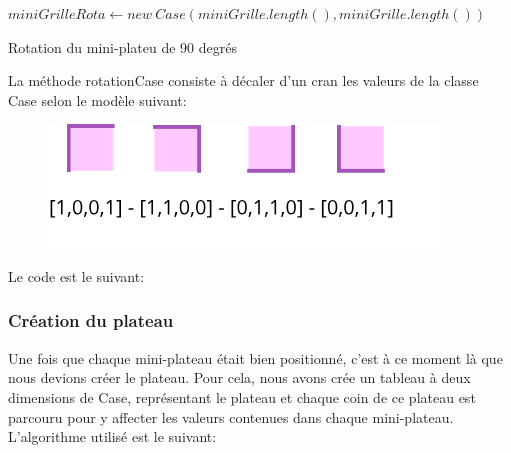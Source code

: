 \documentclass[a4paper, 12pt]{article}
\begin{document}
            \begin{algorithm}[H]%
                \DontPrintSemicolon
                $miniGrilleRota \gets new \ Case(miniGrille.length(), miniGrille.length())$
                \;
                \caption{\sc Rotation du mini-plateu de 90 degrés}
            \end{algorithm}%
        
            \newpage
            La méthode rotationCase consiste à décaler d'un cran les valeurs de la classe Case selon le modèle suivant:
            
           \begin{figure}[H]
               \centering
               \includegraphics[scale=0.7]{images/rotaCase.png}
           \end{figure}
           
           Le code est le suivant:
           
            
            
                
        \subsubsection{Création du plateau}
            Une fois que chaque mini-plateau était bien positionné, c'est à ce moment là que nous devions créer le plateau. Pour cela, nous avons crée un tableau à deux dimensions de Case, représentant le plateau et chaque coin de ce plateau est parcouru pour y affecter les valeurs contenues dans chaque mini-plateau. L'algorithme utilisé est le suivant:
            \newpage
      
\end{document}
